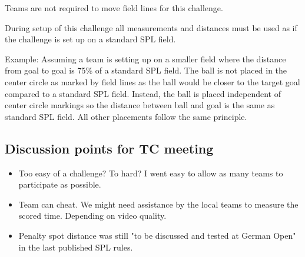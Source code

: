 Teams are not required to move field lines for this challenge.

During setup of this challenge all measurements and distances must be used as if the challenge is set up on a standard SPL field.

Example: Assuming a team is setting up on a smaller field where the distance from goal to goal is 75\% of a standard SPL field. The ball is not placed in the center circle as marked by field lines as the ball would be closer to the target goal compared to a standard SPL field. Instead, the ball is placed independent of center circle markings so the distance between ball and goal is the same as standard SPL field. All other placements follow the same principle.

\subsection{Discussion points for TC meeting}

\begin{itemize}
	\item Too easy of a challenge? To hard? I went easy to allow as many teams to participate as possible.
	\item Team can cheat. We might need assistance by the local teams to measure the scored time. Depending on video quality.
	\item Penalty spot distance was still "to be discussed and tested at German Open" in the last published SPL rules.
\end{itemize}
